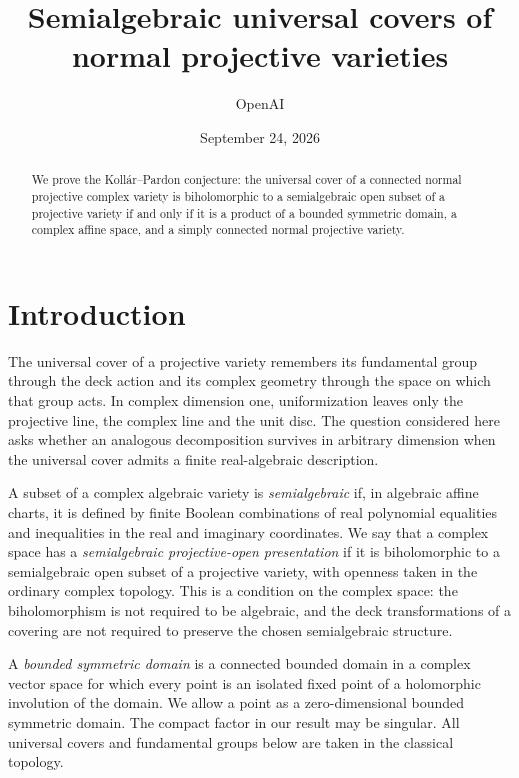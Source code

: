 \documentclass[11pt]{article}
\title{Semialgebraic universal covers of normal projective varieties}
\author{OpenAI}
\date{September 24, 2026}
\theoremstyle{definition}
\theoremstyle{remark}
\begin{document}
\maketitle

\begin{abstract}
We prove the Koll\'ar--Pardon conjecture: the universal cover of a
connected normal projective complex variety is biholomorphic to a
semialgebraic open subset of a projective variety if and only if it
is a product of a bounded symmetric domain, a complex affine space,
and a simply connected normal projective variety.
\end{abstract}

\section{Introduction}\label{sec:introduction}

The universal cover of a projective variety remembers its fundamental
group through the deck action and its complex geometry through the
space on which that group acts. In complex dimension one, uniformization
leaves only the projective line, the complex line and the unit disc.
The question considered here asks whether an analogous decomposition
survives in arbitrary dimension when the universal cover admits a
finite real-algebraic description.

A subset of a complex algebraic variety is \emph{semialgebraic} if,
in algebraic affine charts, it is defined by finite Boolean combinations
of real polynomial equalities and inequalities in the real and imaginary
coordinates. We say that a complex space has a \emph{semialgebraic
projective-open presentation} if it is biholomorphic to a semialgebraic
open subset of a projective variety, with openness taken in the ordinary
complex topology. This is a condition on the complex space: the
biholomorphism is not required to be algebraic, and the deck
transformations of a covering are not required to preserve the chosen
semialgebraic structure.

A \emph{bounded symmetric domain} is a connected bounded domain in a
complex vector space for which every point is an isolated fixed point
of a holomorphic involution of the domain. We allow a point as a
zero-dimensional bounded symmetric domain. The compact factor in our
result may be singular. All universal covers and fundamental groups
below are taken in the classical topology.
\end{document}
